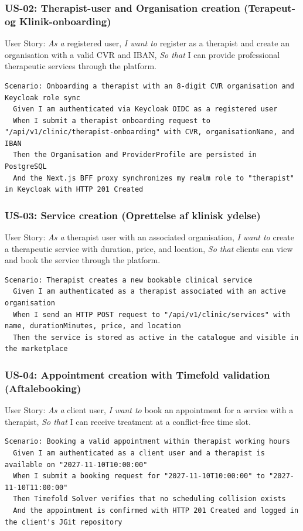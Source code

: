 \documentclass[11pt,a4paper]{article}
\begin{document}
\begin{table}[htbp]
\begin{table}[htbp]
\subsubsection{US-02: Therapist-user and Organisation creation (Terapeut- og Klinik-onboarding)}
User Story: \textit{As a} registered user, \textit{I want to} register as a therapist and create an organisation with a valid CVR and IBAN, \textit{So that} I can provide professional therapeutic services through the platform.
\begin{lstlisting}[language={}]
Scenario: Onboarding a therapist with an 8-digit CVR organisation and Keycloak role sync
  Given I am authenticated via Keycloak OIDC as a registered user
  When I submit a therapist onboarding request to "/api/v1/clinic/therapist-onboarding" with CVR, organisationName, and IBAN
  Then the Organisation and ProviderProfile are persisted in PostgreSQL
  And the Next.js BFF proxy synchronizes my realm role to "therapist" in Keycloak with HTTP 201 Created
\end{lstlisting}

\subsubsection{US-03: Service creation (Oprettelse af klinisk ydelse)}
User Story: \textit{As a} therapist user with an associated organisation, \textit{I want to} create a therapeutic service with duration, price, and location, \textit{So that} clients can view and book the service through the platform.
\begin{lstlisting}[language={}]
Scenario: Therapist creates a new bookable clinical service
  Given I am authenticated as a therapist associated with an active organisation
  When I send an HTTP POST request to "/api/v1/clinic/services" with name, durationMinutes, price, and location
  Then the service is stored as active in the catalogue and visible in the marketplace
\end{lstlisting}

\subsubsection{US-04: Appointment creation with Timefold validation (Aftalebooking)}
User Story: \textit{As a} client user, \textit{I want to} book an appointment for a service with a therapist, \textit{So that} I can receive treatment at a conflict-free time slot.
\begin{lstlisting}[language={}]
Scenario: Booking a valid appointment within therapist working hours
  Given I am authenticated as a client user and a therapist is available on "2027-11-10T10:00:00"
  When I submit a booking request for "2027-11-10T10:00:00" to "2027-11-10T11:00:00"
  Then Timefold Solver verifies that no scheduling collision exists
  And the appointment is confirmed with HTTP 201 Created and logged in the client's JGit repository
\end{lstlisting}


\end{table}
\end{table}
\end{document}
